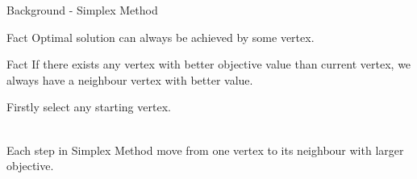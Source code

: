 \documentclass{beamer}
\begin{document}
\begin{frame}{Background - Simplex Method}
	\begin{exampleblock}{Fact}
		Optimal solution can always be achieved by some vertex.
	\end{exampleblock}

	\begin{exampleblock}{Fact}
		If there exists any vertex with better objective value than current vertex, we always have a neighbour vertex with better value.
	\end{exampleblock}

	Firstly select any starting vertex. \\~\

	Each step in Simplex Method move from one vertex to its neighbour with larger objective.


\end{frame}

\end{document}
